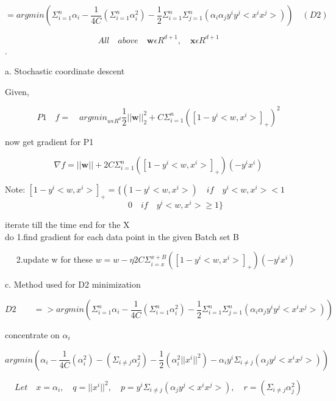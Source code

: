 \documentclass{article}
\begin{document}
 \[ =argmin(\Sigma _{i=1} ^n \alpha _i - \frac{1}{4C} (\Sigma _{i=1} ^n  \alpha _i ^2) - \frac{1}{2}\Sigma _{i=1} ^n \Sigma _{j=1} ^n ( \alpha _i \alpha _j y^i y^j< x^i x^j>)) \quad (D2) \]

\[ All \quad above \quad \textbf{w} \epsilon R ^{d+1} , \quad \textbf{x} \epsilon R ^{d+1} \]
. 

a. Stochastic coordinate descent 

Given,

	\[ P1 \quad f = \quad argmin _{ w \epsilon R^d } \frac{1}{2} || \textbf{w} || _2 ^2 + C \Sigma _{i=1} ^n  ([ 1 - y^i <w,x^i> ]_+)^2   \]

now  get gradient for P1 

\[  \nabla f = || \textbf{w} ||  + 2 C \Sigma _{i=1} ^n  ([ 1 - y^i <w,x^i> ]_+)(-y^i x^i) \]

\vspace{5mm}

Note: $ [ 1 - y^i <w,x^i> ]_+ = \{ ( 1 - y^i <w,x^i> ) \quad if \quad y^i <w,x^i> < 1 $ \\
\[ \qquad \qquad  0 \quad if \quad y^i <w,x^i> \geqslant 1 \} \] 

iterate till the time end for the X
\\

do  1.find gradient for each data point in the given Batch set B  \vspace{1mm}

 $ \quad $ 2.update w for these $ w = w - \eta 2 C \Sigma _{i=x} ^{x+B}  ([ 1 - y^i <w,x^i> ]_+)(-y^i x^i)$

\vspace{5mm}




c. Method used for  D2 minimization 

\[ D2  \qquad => argmin(\Sigma _{i=1} ^n \alpha _i - \frac{1}{4C} (\Sigma _{i=1} ^n  \alpha _i ^2) - \frac{1}{2}\Sigma _{i=1} ^n \Sigma _{j=1} ^n ( \alpha _i \alpha _j y^i y^j< x^i x^j>)) \]

concentrate on $ \alpha _i $

\[  argmin( \alpha _i - \frac{1}{4C} (  \alpha _i ^2) -  (\Sigma _{i \neq j}   \alpha _j ^2) - \frac{1}{2}( \alpha _i^2 ||x^i||^2) - \alpha _iy^i\Sigma _{i \neq j}  (  \alpha _j  y^j< x^i x^j>)) \]


\[ Let \quad  x = \alpha _i , \quad q = ||x ^i || ^2 , \quad p = y^i\Sigma _{i \neq j}  (  \alpha _j  y^j< x^i x^j>) , \quad r = (\Sigma _{i \neq j}   \alpha _j ^2) \]
\end{document}
